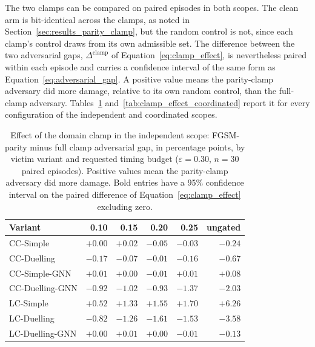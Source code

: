 The two clamps can be compared on paired episodes in both scopes. The clean arm is
bit-identical across the clamps, as noted in
Section~\ref{sec:results_parity_clamp}, but the random control is not, since each
clamp's control draws from its own admissible set. The difference between the two
adversarial gaps, $\Delta^{\text{clamp}}$ of Equation~\eqref{eq:clamp_effect}, is
nevertheless paired within each episode and carries a confidence interval of the same
form as Equation~\eqref{eq:adversarial_gap}. A positive value means the parity-clamp adversary
did more damage, relative to its own random control, than the full-clamp adversary.
Tables~\ref{tab:clamp_effect} and~\ref{tab:clamp_effect_coordinated} report it for
every configuration of the independent and coordinated scopes.

\begin{table}[htbp]
  \centering
  \caption{Effect of the domain clamp in the independent scope: FGSM-parity minus full
           clamp adversarial gap, in percentage points, by victim variant and requested
           timing budget ($\varepsilon = 0.30$, $n = 30$ paired episodes). Positive
           values mean the parity-clamp adversary did more damage. Bold entries have a
           95\% confidence interval on the paired difference of
           Equation~\eqref{eq:clamp_effect} excluding zero.}
  \label{tab:clamp_effect}
  \begin{tabular}{lrrrrr}
    \hline
    \textbf{Variant} & \textbf{0.10} & \textbf{0.15} & \textbf{0.20} & \textbf{0.25} & \textbf{ungated} \\
    \hline
    CC-Simple        & $+0.00$ & $+0.02$ & $-0.05$ & $-0.03$ & $\mathbf{-0.24}$ \\
    CC-Duelling      & $-0.17$ & $-0.07$ & $-0.01$ & $-0.16$ & $-0.67$ \\
    CC-Simple-GNN    & $+0.01$ & $+0.00$ & $-0.01$ & $+0.01$ & $\mathbf{+0.08}$ \\
    CC-Duelling-GNN  & $\mathbf{-0.92}$ & $\mathbf{-1.02}$ & $\mathbf{-0.93}$ & $\mathbf{-1.37}$ & $\mathbf{-2.03}$ \\
    LC-Simple        & $\mathbf{+0.52}$ & $\mathbf{+1.33}$ & $\mathbf{+1.55}$ & $\mathbf{+1.70}$ & $\mathbf{+6.26}$ \\
    LC-Duelling      & $\mathbf{-0.82}$ & $\mathbf{-1.26}$ & $\mathbf{-1.61}$ & $\mathbf{-1.53}$ & $\mathbf{-3.58}$ \\
    LC-Duelling-GNN  & $+0.00$ & $+0.01$ & $+0.00$ & $-0.01$ & $-0.13$ \\
    \hline
  \end{tabular}
\end{table}

